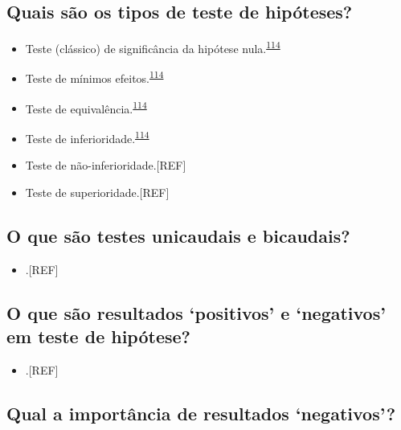 \documentclass[
  a4paper,
]{book}
\providecommand{\tightlist}{%
  \setlength{\itemsep}{0pt}\setlength{\parskip}{0pt}}
\begin{document}
\hypertarget{quais-suxe3o-os-tipos-de-teste-de-hipuxf3teses}{%
\subsection{Quais são os tipos de teste de hipóteses?}\label{quais-suxe3o-os-tipos-de-teste-de-hipuxf3teses}}

\begin{itemize}
\item
  Teste (clássico) de significância da hipótese nula.\textsuperscript{\protect\hyperlink{ref-lakens2018}{114}}
\item
  Teste de mínimos efeitos.\textsuperscript{\protect\hyperlink{ref-lakens2018}{114}}
\item
  Teste de equivalência.\textsuperscript{\protect\hyperlink{ref-lakens2018}{114}}
\item
  Teste de inferioridade.\textsuperscript{\protect\hyperlink{ref-lakens2018}{114}}
\item
  Teste de não-inferioridade.{[}REF{]}
\item
  Teste de superioridade.{[}REF{]}
\end{itemize}

\hypertarget{o-que-suxe3o-testes-unicaudais-e-bicaudais}{%
\subsection{O que são testes unicaudais e bicaudais?}\label{o-que-suxe3o-testes-unicaudais-e-bicaudais}}

\begin{itemize}
\tightlist
\item
  .{[}REF{]}
\end{itemize}

\hypertarget{o-que-suxe3o-resultados-positivos-e-negativos-em-teste-de-hipuxf3tese}{%
\subsection{O que são resultados `positivos' e `negativos' em teste de hipótese?}\label{o-que-suxe3o-resultados-positivos-e-negativos-em-teste-de-hipuxf3tese}}

\begin{itemize}
\tightlist
\item
  .{[}REF{]}
\end{itemize}

\hypertarget{qual-a-importuxe2ncia-de-resultados-negativos}{%
\subsection{Qual a importância de resultados `negativos'?}\label{qual-a-importuxe2ncia-de-resultados-negativos}}
\end{document}
